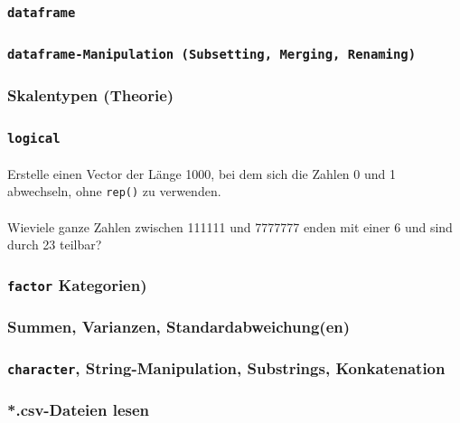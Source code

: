 \documentclass[paper=A4, pagesize, DIV=calc, smallheadings,
fontsize=12pt, expansion=false]{scrreprt}
\begin{document}
\subsubsection*{\texttt{\textbf{dataframe}}}



\subsubsection*{\texttt{\textbf{dataframe}-Manipulation (Subsetting, Merging, Renaming)}}

\subsubsection*{Skalentypen (Theorie)}

\subsubsection*{\texttt{logical}}

\paragraph{}
Erstelle einen Vector der Länge 1000, bei dem sich die Zahlen 0 und 1 abwechseln, ohne \texttt{rep()} zu verwenden.

\paragraph{}
Wieviele ganze Zahlen zwischen 111111 und 7777777 enden mit einer 6 und sind durch 23 teilbar?

\subsubsection*{\texttt{\textbf{factor}} Kategorien)}

\subsubsection*{Summen, Varianzen, Standardabweichung(en)}

\subsubsection*{\texttt{character}, String-Manipulation, Substrings, Konkatenation}
  
\subsubsection*{*.csv-Dateien lesen}
\end{document}
